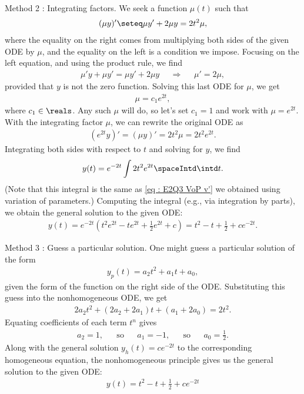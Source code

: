{Method 2 : Integrating factors. We seek a function $\mu(t)$ such that
\begin{align*}
(\mu y)'
\seteq
\mu y' + 2 \mu y
=
2 t^{2} \mu,
\end{align*}
where the equality on the right comes from multiplying both sides of the given ODE by $\mu$, and the equality on the left is a condition we impose. Focusing on the left equation, and using the product rule, we find
\begin{align*}
\mu' y + \mu y'
=
\mu y' + 2 \mu y
&&
\Rightarrow
&&
\mu'
=
2 \mu,
\end{align*}
provided that $y$ is not the zero function. Solving this last ODE for $\mu$, we get
\begin{align*}
\mu
=
c_{1} e^{2 t},
\end{align*}
where $c_{1} \in \reals$. Any such $\mu$ will do, so let's set $c_{1} = 1$ and work with $\mu = e^{2 t}$. With the integrating factor $\mu$, we can rewrite the original ODE as
\begin{align*}
\left(e^{2 t} y\right)'
=
(\mu y)'
=
2 t^{2} \mu
=
2 t^{2} e^{2 t}.
\end{align*}
Integrating both sides with respect to $t$ and solving for $y$, we find
\begin{align*}
y(t)
=
e^{-2 t} \int 2 t^{2} e^{2 t} \spaceIntd \intd t.
\end{align*}
(Note that this integral is the same as \eqref{eq : E2Q3 VoP v'} we obtained using variation of parameters.) Computing the integral (e.g., via integration by parts), we obtain the general solution to the given ODE:
\begin{align*}
y(t)
=
e^{-2 t} \left(t^{2} e^{2 t} - t e^{2 t} + \frac{1}{2} e^{2 t} + c\right)
=
t^{2} - t + \frac{1}{2} + c e^{-2 t}.
\end{align*}



Method 3 : Guess a particular solution. One might guess a particular solution of the form
\begin{align*}
y_{p}(t)
=
a_{2} t^{2} + a_{1} t + a_{0},
\end{align*}
given the form of the function on the right side of the ODE. Substituting this guess into the nonhomogeneous ODE, we get
\begin{align*}
2 a_{2} t^{2} + (2 a_{2} + 2 a_{1}) t + (a_{1} + 2 a_{0})
=
2 t^{2}.
\end{align*}
Equating coefficients of each term $t^{n}$ gives
\begin{align*}
a_{2}
=
1,
&&
\text{so}
&&
a_{1}
=
-1,
&&
\text{so}
&&
a_{0}
=
\frac{1}{2}.
\end{align*}
Along with the general solution $y_{h}(t) = c e^{-2 t}$ to the corresponding homogeneous equation, the nonhomogeneous principle gives us the general solution to the given ODE:
\begin{align*}
y(t)
=
t^{2} - t + \frac{1}{2} + c e^{-2 t}
\end{align*}



}
